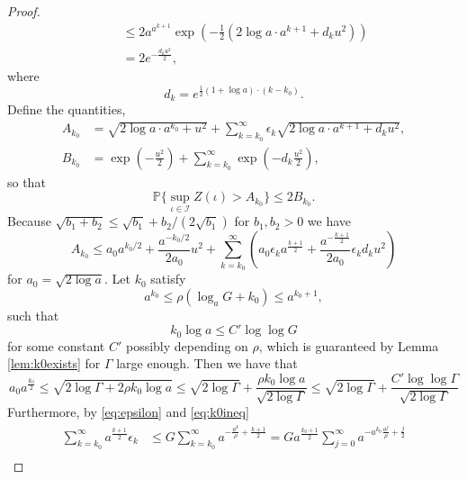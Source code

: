 \begin{proof}
\begin{align*}
    &\quad \le 2 a^{a^{k+1}}\exp \left(-\frac 12 \left(2 \log a \cdot a^{k+1} +  d_k u^2 \right)\right) \\
    &\quad = 2 e^{-\frac{d_k u^2}{2}},
\end{align*}
where
\begin{equation}
\label{eq:ddef}
    d_k = e^{\frac 12 \left( 1 + \log a \right) \cdot (k-k_0)}.
\end{equation}
Define the quantities, 
\begin{align*}
    A_{k_0} &= \sqrt{2 \log a \cdot a^{k_0} + u^2} + \sum_{k=k_0}^{\infty} \epsilon_k \sqrt{2 \log a \cdot a^{k+1} + d_k u^2},\\
    B_{k_0} &= \exp \left( - \frac{u^2}{2} \right) + \sum_{k=k_0}^\infty \exp \left(- d_k \frac{u^2}{2} \right),
\end{align*}
so that 
\begin{equation}
\label{eq:Aprobbd}
    \mathbb P \{ \sup_{\iota \in \mathcal I} Z(\iota) > A_{k_0} \} \le 2 B_{k_0}.
\end{equation}
Because $\sqrt{b_1 + b_2} \le \sqrt{b_1} + b_2 / (2 \sqrt{b_1})$ for $b_1,b_2 > 0$ we have 
\begin{equation}
\label{eq:Abound}
    A_{k_0} \le a_0 a^{k_0/2} + \frac{a^{-k_0/2}}{2 a_0} u^2 + \sum_{k=k_0}^\infty \left(a_0 \epsilon_k a^{\frac{k+1}{2}} + \frac{a^{- \frac{k+1}{2}}}{2 a_0} \epsilon_k d_k u^2 \right)
\end{equation}
for $a_0 = \sqrt{2 \log a}$.
Let $k_0$ satisfy
\begin{equation}
\label{eq:k0ineq}
    a^{k_0} \le \rho (\log_a G + k_0) \le a^{k_0 + 1},
\end{equation}
such that
$$
k_0 \log a \le C' \log \log G
$$
for some constant $C'$ possibly depending on $\rho$,
which is guaranteed by Lemma \ref{lem:k0exists} for $\Gamma$ large enough.
Then we have that 
\begin{equation}
\label{eq:Aterm1}
    a_0 a^{\frac{k_0}{2}} \le \sqrt{2 \log \Gamma + 2 \rho k_0 \log a} \le \sqrt{2 \log \Gamma} + \frac{\rho k_0 \log a}{\sqrt{2 \log \Gamma}} \le \sqrt{2 \log \Gamma} + \frac{C' \log \log \Gamma}{\sqrt{2 \log \Gamma}}
\end{equation}
Furthermore, by \eqref{eq:epsilon} and \eqref{eq:k0ineq}
\begin{align*}
    \sum_{k=k_0}^\infty a^{\frac{k+1}{2}} \epsilon_k &\le G \sum_{k=k_0}^{\infty} a^{-\frac{a^k}{\rho} + \frac{k+1}{2}} = G a^{\frac{k_0 + 1}{2}} \sum_{j=0}^{\infty} a^{-a^{k_0} \frac{a^j}{\rho} + \frac{j}{2}}\\

\end{align*}
\end{proof}
